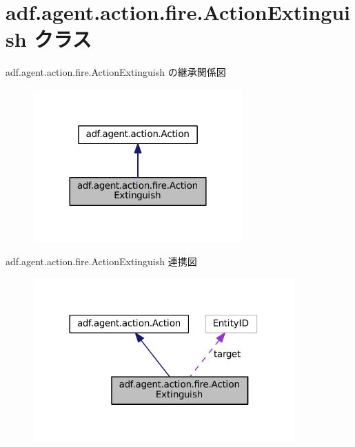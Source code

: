 \hypertarget{classadf_1_1agent_1_1action_1_1fire_1_1ActionExtinguish}{}\section{adf.\+agent.\+action.\+fire.\+Action\+Extinguish クラス}
\label{classadf_1_1agent_1_1action_1_1fire_1_1ActionExtinguish}


adf.\+agent.\+action.\+fire.\+Action\+Extinguish の継承関係図
\nopagebreak
\begin{figure}[H]
\begin{center}
\leavevmode
\includegraphics[width=228pt]{classadf_1_1agent_1_1action_1_1fire_1_1ActionExtinguish__inherit__graph}
\end{center}
\end{figure}


adf.\+agent.\+action.\+fire.\+Action\+Extinguish 連携図
\nopagebreak
\begin{figure}[H]
\begin{center}
\leavevmode
\includegraphics[width=284pt]{classadf_1_1agent_1_1action_1_1fire_1_1ActionExtinguish__coll__graph}
\end{center}
\end{figure}
